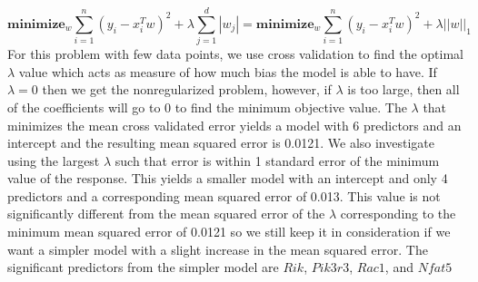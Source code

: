 \documentclass{article}
\begin{document}
\begin{equation}
	\textbf{minimize}_w \sum_{i=1}^n(y_i-x_i^Tw)^2+\lambda\sum_{j=1}^d |w_j| = \textbf{minimize}_w \sum_{i=1}^n(y_i-x_i^Tw)^2+\lambda||w||_1
	\label{eq:lasso}
\end{equation}
For this problem with few data points, we use cross validation to find the optimal $\lambda$ value which acts as measure of how much bias the model is able to have.  If $\lambda = 0$ then we get the nonregularized problem, however, if $\lambda$ is too large, then all of the coefficients will go to $0$ to find the minimum objective value.  The $\lambda$ that minimizes the mean cross validated error yields a model with 6 predictors and an intercept and the resulting mean squared error is 0.0121.  We also investigate using the largest $\lambda$ such that error is within 1 standard error of the minimum value of the response.  This yields a smaller model with an intercept and only 4 predictors and a corresponding mean squared error of 0.013. This value is not significantly different from the mean squared error of the $\lambda$ corresponding to the minimum mean squared error of 0.0121 so we still keep it in consideration if we want a simpler model with a slight increase in the mean squared error.  The significant predictors from the simpler model are $Rik$, $Pik3r3$, $Rac1$, and $Nfat5$
\end{document}
